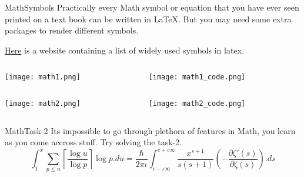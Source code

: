 \begin{frame}{Math}{Symbols}
	\footnotesize
	Practically every Math symbol
	or equation that you have ever seen printed on a text book can be
	written in \LaTeX. But you may need some extra packages to render different
	symbols. \vspace{1em}

	\href{https://oeis.org/wiki/List\_of\_LaTeX\_mathematical\_symbols}{Here} is a
	website containing a list of widely used symbols in latex.

	\begin{columns}
		\begin{column}{0.5\textwidth}
			\texttt{[image: math1.png]}
		\end{column}
		\begin{column}{0.5\textwidth}
			\texttt{[image: math1\_code.png]}
		\end{column}
	\end{columns}

	\begin{columns}
		\begin{column}{0.5\textwidth}
			\texttt{[image: math2.png]}
		\end{column}
		\begin{column}{0.5\textwidth}
			\texttt{[image: math2\_code.png]}
		\end{column}
	\end{columns}

\end{frame}


\begin{frame}{Math}{Task-2}
	Its impossible to go through plethora of features in Math, you learn
	as you come accross stuff.
    Try solving the task-2.
$$ \int_{1}^{x} \sum_{p\leq u}\left\lceil \frac{\log u}{\log p} \right\rceil \log p.du
= \frac{\hbar}{2\pi \iota}\int_{c-\iota \infty}^{c+\iota \infty}
\frac{x^{s+1}}{s(s+1)} \left( - \frac{\partial\zeta '(s)}{\partial\zeta(s)} \right).ds$$
\end{frame}

